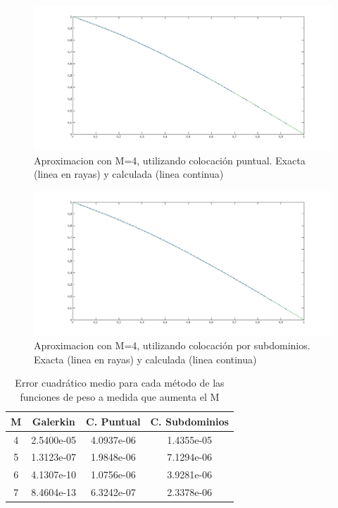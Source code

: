 \documentclass[11pt]{article}
\begin{document}
\begin{figure}
	\centering
		\includegraphics[width=1.0\textwidth]{Fig2.png}
	\caption{Aproximacion con M=4, utilizando colocaci\'on puntual. Exacta (linea en rayas) y calculada (linea continua)}
	\label{fig:Fig2}
\end{figure}

\begin{figure}
	\centering
		\includegraphics[width=1.0\textwidth]{Fig3.png}
	\caption{Aproximacion con M=4, utilizando colocaci\'on por subdominios. Exacta (linea en rayas) y calculada (linea continua)}
	\label{fig:Fig3}
\end{figure}

\begin{table}[h!]
\centering
\begin{tabular}{||c c c c||} 
 \hline
 M & Galerkin & C. Puntual & C. Subdominios \\ [0.5ex] 
 \hline\hline
 4 & 2.5400e-05 & 4.0937e-06 & 1.4355e-05 \\ 
 5 & 1.3123e-07 & 1.9848e-06 & 7.1294e-06 \\
 6 & 4.1307e-10 & 1.0756e-06 & 3.9281e-06 \\
 7 & 8.4604e-13 & 6.3242e-07 & 2.3378e-06 \\ [1ex] 
 \hline
\end{tabular}
\bigskip 
\caption{Error cuadr\'atico medio para cada m\'etodo de las funciones de peso a medida que aumenta el M}
\label{table:1}
\end{table}
\end{document}
